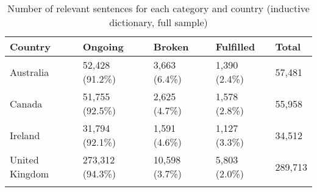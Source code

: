 \begingroup\footnotesize
\begin{longtable}{p{}p{}p{}p{}p{}}
\caption{Number of relevant sentences for each category and country (inductive dictionary, full sample)} \\ 
  \hline
Country & Ongoing & Broken & Fulfilled & Total \\ 
  \hline 
\endhead 
\hline 
\endfoot 
\endlastfoot 
Australia & 52,428 (91.2\%) & 3,663 (6.4\%) & 1,390 (2.4\%) & 57,481 \\ 
  Canada & 51,755 (92.5\%) & 2,625 (4.7\%) & 1,578 (2.8\%) & 55,958 \\ 
  Ireland & 31,794 (92.1\%) & 1,591 (4.6\%) & 1,127 (3.3\%) & 34,512 \\ 
  United Kingdom & 273,312 (94.3\%) & 10,598 (3.7\%) & 5,803 (2.0\%) & 289,713 \\ 
  \hline
\label{tab:articles_inductive_full}
\end{longtable}
\endgroup
